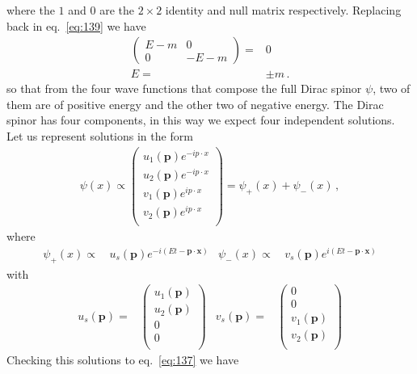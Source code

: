 where the $1$ and $0$ are the $2\times2$ identity and null matrix respectively. Replacing back in eq.~\eqref{eq:139} we have
\begin{align}
  \begin{pmatrix}
    E-m&0\\
    0  &-E-m
  \end{pmatrix}=&0\nonumber\\
  E=&\pm m\,.
\end{align}
so that from the four wave functions that compose the full Dirac spinor $\psi$, two of them are of positive energy and the other two of negative energy. 
The Dirac spinor has four components, in this way we expect four independent solutions. Let us represent solutions in the form
\begin{align}
\label{eq:136}
  \psi(x)\propto
  \begin{pmatrix}
    u_1(\mathbf{p})e^{-i p\cdot x}\\
    u_2(\mathbf{p})e^{-i p\cdot x}\\
    v_1(\mathbf{p})e^{i p\cdot x}\\
    v_2(\mathbf{p})e^{i p\cdot x}\\
  \end{pmatrix}
 =\psi_+(x)+\psi_-(x)\,,
\end{align}
where
\begin{align}
  \psi_+(x)\propto\,&u_s(\mathbf{p})e^{-i (E t-\mathbf{p}\cdot \mathbf{x})}&
  \psi_-(x)\propto\,&v_s(\mathbf{p})e^{i (E t-\mathbf{p}\cdot \mathbf{x})}
\end{align}
with
\begin{align}
  u_s(\mathbf{p})=&\begin{pmatrix}
    u_1(\mathbf{p})\\
    u_2(\mathbf{p})\\
    0\\
    0\\
  \end{pmatrix}&
  v_s(\mathbf{p})=& \begin{pmatrix}
    0\\
    0\\
    v_1(\mathbf{p})\\
    v_2(\mathbf{p})\\
  \end{pmatrix}
\end{align}
Checking this solutions to eq.~\eqref{eq:137} we have

